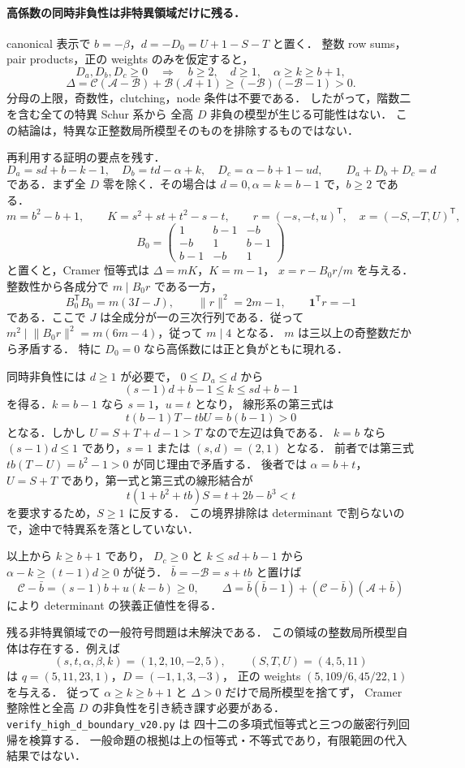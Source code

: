 \paragraph{高係数の同時非負性は非特異領域だけに残る．}
\label{nhd20:reduction}
canonical 表示で $b=-\beta$，$d=-D_0=U+1-S-T$ と置く．
整数 row sums，pair products，正の weights のみを仮定すると，
\[
 D_a,D_b,D_c\ge0
 \quad\Longrightarrow\quad
 b\ge2,\quad d\ge1,\quad \alpha\ge k\ge b+1,
\]
\[
 \Delta=\mathcal C(\mathcal A-\mathcal B)
          +\mathcal B(\mathcal A+1)
 \ge(-\mathcal B)(-\mathcal B-1)>0.
\]
分母の上限，奇数性，clutching，node 条件は不要である．
したがって，階数二を含む全ての特異 Schur 系から
全高 $D$ 非負の模型が生じる可能性はない．
この結論は，特異な正整数局所模型そのものを排除するものではない．

再利用する証明の要点を残す．
\[
 D_a=sd+b-k-1,\quad
 D_b=td-\alpha+k,\quad
 D_c=\alpha-b+1-ud,\qquad
 D_a+D_b+D_c=d
\]
である．まず全 $D$ 零を除く．その場合は
$d=0,\alpha=k=b-1$ で，$b\ge2$ である．
\[
 m=b^2-b+1,\qquad K=s^2+st+t^2-s-t,\qquad
 r=(-s,-t,u)^{\mathsf T},\quad x=(-S,-T,U)^{\mathsf T},
\]
\[
 B_0=\begin{pmatrix}
 1&b-1&-b\\
 -b&1&b-1\\
 b-1&-b&1
 \end{pmatrix}
\]
と置くと，Cramer 恒等式は $\Delta=mK$，$K=m-1$，
$x=r-B_0r/m$ を与える．整数性から各成分で $m\mid B_0r$ である一方，
\[
 B_0^{\mathsf T}B_0=m(3I-J),\qquad
 \lVert r\rVert^2=2m-1,\qquad \mathbf1^{\mathsf T}r=-1
\]
である．ここで $J$ は全成分が一の三次行列である．従って
$m^2\mid\lVert B_0r\rVert^2=m(6m-4)$，従って $m\mid4$ となる．
$m$ は三以上の奇整数だから矛盾する．
特に $D_0=0$ なら高係数には正と負がともに現れる．

同時非負性には $d\ge1$ が必要で，
$0\le D_a\le d$ から
\[
 (s-1)d+b-1\le k\le sd+b-1
\]
を得る．$k=b-1$ なら $s=1$，$u=t$ となり，
線形系の第三式は
\[
 t(b-1)T-tbU=b(b-1)>0
\]
となる．しかし $U=S+T+d-1>T$ なので左辺は負である．
$k=b$ なら $(s-1)d\le1$ であり，$s=1$ または $(s,d)=(2,1)$ となる．
前者では第三式 $tb(T-U)=b^2-1>0$ が同じ理由で矛盾する．
後者では $\alpha=b+t$，$U=S+T$ であり，第一式と第三式の線形結合が
\[
 t(1+b^2+tb)S=t+2b-b^3<t
\]
を要求するため，$S\ge1$ に反する．
この境界排除は determinant で割らないので，途中で特異系を落としていない．

以上から $k\ge b+1$ であり，
$D_c\ge0$ と $k\le sd+b-1$ から
$\alpha-k\ge(t-1)d\ge0$ が従う．
$\bar b=-\mathcal B=s+tb$ と置けば
\[
 \mathcal C-\bar b=(s-1)b+u(k-b)\ge0,\qquad
 \Delta=\bar b(\bar b-1)+(\mathcal C-\bar b)(\mathcal A+\bar b)
\]
により determinant の狭義正値性を得る．

残る非特異領域での一般符号問題は未解決である．
この領域の整数局所模型自体は存在する．例えば
\[
 (s,t,\alpha,\beta,k)=(1,2,10,-2,5),\qquad
 (S,T,U)=(4,5,11)
\]
は $q=(5,11,23,1)$，$D=(-1,1,3,-3)$，
正の weights $(5,109/6,45/22,1)$ を与える．
従って $\alpha\ge k\ge b+1$ と $\Delta>0$ だけで局所模型を捨てず，
Cramer 整除性と全高 $D$ の非負性を引き続き課す必要がある．
\nolinkurl{verify_high_d_boundary_v20.py} は
四十二の多項式恒等式と三つの厳密行列回帰を検算する．
一般命題の根拠は上の恒等式・不等式であり，有限範囲の代入結果ではない．
